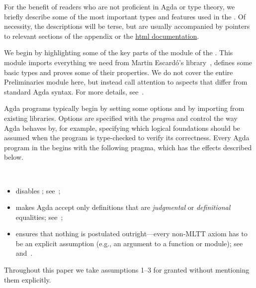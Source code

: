 For the benefit of readers who are not proficient in Agda or type theory, we briefly describe some of the most important types and features used in the \ualib.  Of necessity, the descriptions will be terse, but are usually accompanied by pointers to relevant sections of the appendix or the \href{https://ualib.gitlab.io}{html documentation}.

We begin by highlighting some of the key parts of the \ualibPreliminaries module of the \ualib. This module imports everything we need from Martin Escard\'o's \typetopology library~\cite{MHE}, defines some basic types and proves some of their properties.  We do not cover the entire Preliminaries module here, but instead call attention to aspects that differ from standard Agda syntax. For more details, see~\cite[\S2]{DeMeo:2021}.

Agda programs typically begin by setting some options and by importing from existing libraries.
Options are specified with the  \emph{pragma} and control the way Agda behaves by, for example, specifying which logical foundations should be assumed when the program is type-checked to verify its correctness. 
Every Agda program in the \ualib begins with the following pragma, which has the effects described below.
\ccpad
\begin{code}[number=code:options]
\>[0]\AgdaSymbol{\{-\#}\AgdaSpace{}%
\AgdaSpace{}%
\AgdaSpace{}%
\AgdaSpace{}%
\AgdaSpace{}%
\AgdaSymbol{\#-\}}\<%
\end{code}
\\[-20pt]
\begin{itemize}
\item {} disables \axiomk; see~\cite{agdaref-axiomk};
\item {} makes Agda accept only definitions that are \emph{judgmental} or \emph{definitional} equalities; see~\cite{agdatools-patternmatching};
\item {} ensures that nothing is postulated outright---every non-MLTT axiom has to be an explicit assumption (e.g., an argument to a function or module); see~\cite{agdaref-safeagda} and~\cite{agdatools-patternmatching}.
\end{itemize}
Throughout this paper we take assumptions 1--3 for granted without mentioning them explicitly.



